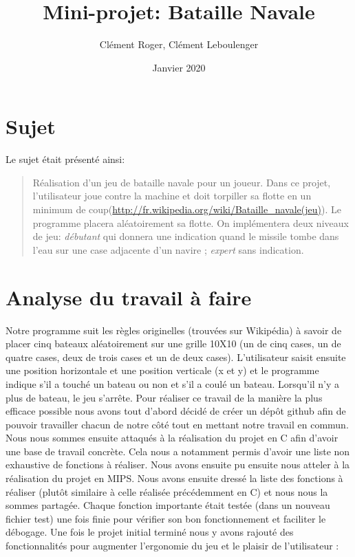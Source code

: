 \documentclass[french]{article}
\title{Mini-projet: Bataille Navale}
\author{Clément Roger, Clément Leboulenger}
\date{Janvier 2020}
\begin{document}
\maketitle

\newpage
\tableofcontents

\newpage
{}

\section{Sujet}
Le sujet était présenté ainsi:
\begin{quotation}
	Réalisation d'un jeu de bataille navale pour un joueur. Dans ce projet, l'utilisateur joue contre la machine et doit torpiller sa flotte en un minimum de coup(\url{http://fr.wikipedia.org/wiki/Bataille_navale(jeu)}). Le programme placera aléatoirement sa flotte. On implémentera deux niveaux de jeu: \emph{débutant} qui donnera une indication quand le missile tombe dans l'eau sur une case adjacente d'un navire ; \emph{expert} sans indication.	
\end{quotation}

\section{Analyse du travail à faire}
Notre programme suit les règles originelles (trouvées sur Wikipédia) à savoir de placer cinq bateaux aléatoirement sur une grille 10X10 (un de cinq cases, un de quatre cases, deux de trois cases et un de deux cases). L’utilisateur saisit ensuite une position horizontale et une position verticale (x et y) et le programme indique s’il a touché un
bateau ou non et s’il a coulé un bateau. Lorsqu’il n’y a plus de bateau, le jeu s’arrête.
Pour réaliser ce travail de la manière la plus efficace possible nous avons tout d'abord décidé de créer un dépôt github afin de pouvoir travailler chacun de notre côté tout en mettant notre travail en commun.
Nous nous sommes ensuite attaqués à la réalisation du projet en C afin d'avoir une base de travail concrète. Cela nous a notamment permis d'avoir une liste non exhaustive de fonctions à réaliser.
Nous avons ensuite pu ensuite nous atteler à la réalisation du projet en MIPS. Nous avons ensuite dressé la liste des fonctions à réaliser (plutôt similaire à celle réalisée précédemment en C) et nous nous la sommes partagée. 
Chaque fonction importante était testée (dans un nouveau fichier test) une fois finie pour vérifier son bon fonctionnement et faciliter le débogage.
Une fois le projet initial terminé nous y avons rajouté des fonctionnalités pour augmenter l'ergonomie du jeu et le plaisir de l'utilisateur :
\end{document}
